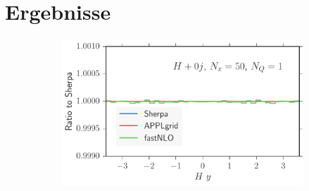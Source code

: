 
\chapter{Ergebnisse}
%
\begin{figure}
\centering
\hfill
\begin{subfigure}[]{0.49\textwidth}
	\includegraphics[width=\textwidth]{images/hb_hy.pdf}
\end{subfigure}


\end{figure}

